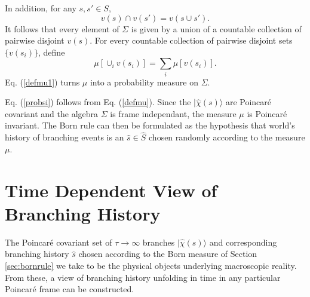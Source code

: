 \documentclass[12pt,amsmath,amssymb,onecolumn]{revtex4-2}
\begin{document}
In addition, for any $s, s' \in S$,
\begin{equation}
  \label{intersection}
  v( s) \cap v(s') = v(s \cup s').
\end{equation}
It follows that every element
of $\Sigma$ is given by a union of a countable collection
of pairwise disjoint $v(s)$.
For every countable collection of pairwise
disjoint sets $\{ v( s_i) \}$, define
\begin{equation}
  \label{defmu1}
  \mu[ \cup_i v(s_i) ] = \sum_i \mu[ v( s_i)].
\end{equation}
Eq. (\ref{defmu1}) turns $\mu$ into a probability measure on $\Sigma$.

Eq. (\ref{probsi}) follows from Eq. (\ref{defmu}). Since
the $|\hat{\chi}(s) \rangle $ are Poincar\'{e} covariant and
the algebra $\Sigma$ is frame independant, the measure
$\mu$ is Poincar\'{e} invariant.
The Born rule can then be formulated as the hypothesis that
world's history of branching events
is an $\hat{s} \in \hat{S}$ chosen randomly according to the
measure $\mu$.



\section{\label{sec:framebranching} Time Dependent View of Branching History}

The Poincar\'{e} covariant set of $\tau \rightarrow \infty$ branches $|\hat{\chi}(s) \rangle $
and corresponding branching history $\hat{s}$ chosen according to the Born measure of
Section \ref{sec:bornrule} we take to be the physical objects
underlying macroscopic reality.
From these, a view of branching history
unfolding in time in any particular Poincar\'{e} frame can be
constructed.
\end{document}
